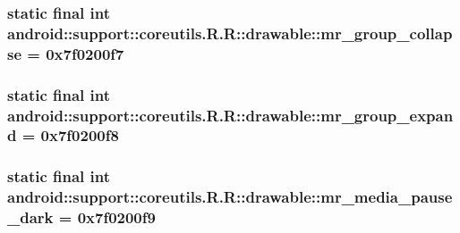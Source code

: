 \hypertarget{classandroid_1_1support_1_1coreutils_1_1_r_1_1drawable_a22890c5660ca9c92f8497275108d554}{
\subsubsection[{mr\_\-group\_\-collapse}]{\setlength{\rightskip}{0pt plus 5cm}static final int android::support::coreutils.R.R::drawable::mr\_\-group\_\-collapse = 0x7f0200f7}}
\label{classandroid_1_1support_1_1coreutils_1_1_r_1_1drawable_a22890c5660ca9c92f8497275108d554}


\hypertarget{classandroid_1_1support_1_1coreutils_1_1_r_1_1drawable_5dff7709f8130b97580fdfcc0528adc4}{
\subsubsection[{mr\_\-group\_\-expand}]{\setlength{\rightskip}{0pt plus 5cm}static final int android::support::coreutils.R.R::drawable::mr\_\-group\_\-expand = 0x7f0200f8}}
\label{classandroid_1_1support_1_1coreutils_1_1_r_1_1drawable_5dff7709f8130b97580fdfcc0528adc4}


\hypertarget{classandroid_1_1support_1_1coreutils_1_1_r_1_1drawable_0c26d17589a8419f71987d9bb50812e7}{
\subsubsection[{mr\_\-media\_\-pause\_\-dark}]{\setlength{\rightskip}{0pt plus 5cm}static final int android::support::coreutils.R.R::drawable::mr\_\-media\_\-pause\_\-dark = 0x7f0200f9}}
\label{classandroid_1_1support_1_1coreutils_1_1_r_1_1drawable_0c26d17589a8419f71987d9bb50812e7}


